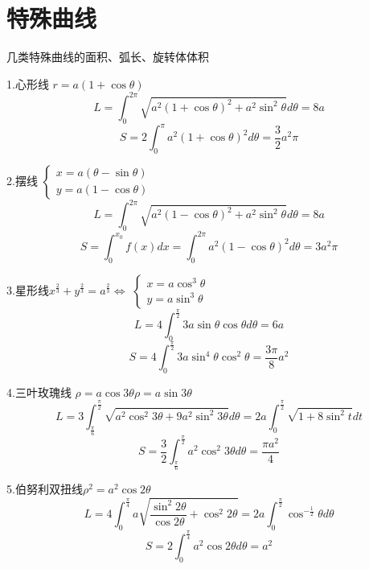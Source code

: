 \section{特殊曲线}

\begin{definition}\label{def: 常用曲线}
	几类特殊曲线的面积、弧长、旋转体体积
	
	1.心形线 \quad $r=a(1+\cos \theta)$
	$$L=\int_{0}^{2\pi}\sqrt{a^2(1+\cos \theta)^2+a^2\sin^2\theta}d\theta=8a$$
	$$S=2\int_{0}^{\pi}a^2(1+\cos \theta)^2d\theta=\frac{3}{2}a^2\pi$$
	
	2.摆线\quad 
	$\left\lbrace
	\begin{array}{l}
		x=a(\theta-\sin \theta)\\
		y=a(1-\cos \theta)
	\end{array}
	 \right. $
	 $$L=\int_{0}^{2\pi}\sqrt{a^2(1-\cos \theta)^2+a^2\sin^2\theta}d\theta=8a$$
	 $$S=\int_{0}^{x_{0}}f(x)dx=\int_{0}^{2\pi}a^2(1-\cos \theta)^2d\theta=3a^2\pi$$
	
	3.星形线\quad $x^{\frac{2}{3}}+y^{\frac{2}{3}}=a^{\frac{2}{3}}\Leftrightarrow$
	$\left\lbrace
	\begin{array}{l}
		x=a\cos^3\theta\\
		y=a\sin^3\theta
	\end{array}
	 \right. $
	$$L=4\int_{0}^{\frac{\pi}{2}}3a\sin\theta\cos\theta d\theta=6a$$
	$$S=4\int_{0}^{\frac{\pi}{2}}3a\sin^4\theta\cos^2\theta=\frac{3\pi}{8}a^2$$
	
	4.三叶玫瑰线 \quad $\rho=a\cos 3\theta$\quad $\rho=a\sin 3\theta$
	$$L=3\int_{\frac{\pi}{6}}^{\frac{\pi}{2}}\sqrt{a^2\cos^2 3\theta+9a^2\sin^2 3\theta}d\theta=2a\int_{0}^{\frac{\pi}{2}}\sqrt{1+8\sin^2 t}dt$$
	$$S=\frac{3}{2}\int_{\frac{\pi}{6}}^{\frac{\pi}{2}}a^2\cos^2 3\theta d\theta=\frac{\pi a^2}{4}$$
	
	5.伯努利双扭线\quad $\rho^2=a^2\cos 2\theta$
	$$L=4\int_{0}^{\frac{\pi}{4}}a\sqrt{\frac{\sin^2 2\theta}{\cos 2\theta}+\cos^2 2\theta}=2a\int_{0}^{\frac{\pi}{2}}\cos^{-\frac{1}{2}}\theta d\theta$$
	$$S=2\int_{0}^{\frac{\pi}{4}}a^2\cos 2\theta d\theta=a^2$$
\end{definition}
